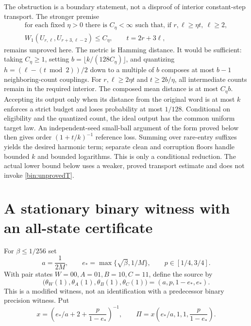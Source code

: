 The obstruction is a boundary statement, not a disproof of interior constant-step transport. The stronger premise
\begin{equation}
 \begin{gathered}
 \text{for each fixed }\eta>0\text{ there is }C_\eta<\infty
 \text{ such that, if }r,\ell\ge\eta t,\ \ell\ge2,\\
 W_1(U_{r,\ell},U_{r+3,\ell-2})\le C_\eta,
 \qquad t=2r+3\ell,
 \end{gathered}
 \label{bin:unprovedT}
\end{equation}
remains unproved here. The metric is Hamming distance. It would be sufficient: taking $C_\eta\ge1$, setting $b=\lfloor k/(128C_\eta)\rfloor$, and quantizing $h=(\ell-(t\bmod2))/2$ down to a multiple of $b$ composes at most $b-1$ neighboring-count couplings. For $r,\ell\ge2\eta t$ and $t\ge2b/\eta$, all intermediate counts remain in the required interior. The composed mean distance is at most $C_\eta b$. Accepting its output only when its distance from the original word is at most $k$ enforces a strict budget and loses probability at most $1/128$. Conditional on eligibility and the quantized count, the ideal output has the common uniform target law. An independent-seed small-ball argument of the form proved below then gives order $(1+t/k)^{-1}$ reference loss. Summing over rare-entry suffixes yields the desired harmonic term; separate clean and corruption floors handle bounded $k$ and bounded logarithms. This is only a conditional reduction. The actual lower bound below uses a weaker, proved transport estimate and does not invoke \eqref{bin:unprovedT}.

\section{A stationary binary witness with an all-state certificate}
\label{bin:witness}
For $\beta\le1/256$ set
\[
 a=\frac1{2M},\qquad e_*=\max\{\sqrt\beta,1/M\},\qquad
 p\in[1/4,3/4].
\]
With pair states $W=00,A=01,B=10,C=11$, define the source by
\begin{equation}
 \bigl(\theta_W(1),\theta_A(1),\theta_B(1),\theta_C(1)\bigr)
       =(a,p,1-e_*,e_*).
 \label{bin:source}
\end{equation}
This is a modified witness, not an identification with a predecessor binary precision witness. Put
\begin{equation}
 x=\left(e_*/a+2+\frac p{1-e_*}\right)^{-1},\qquad
 \Pi=x\left(e_*/a,1,1,\frac p{1-e_*}\right).
 \label{bin:stationary}
\end{equation}

